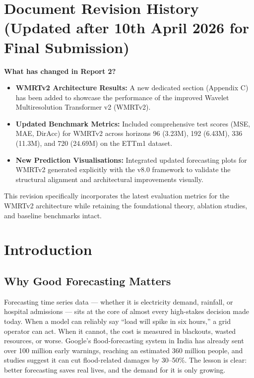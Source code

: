 \documentclass[11pt, letterpaper]{article}
\begin{document}
\section*{Document Revision History (Updated after 10th April 2026 for Final Submission)}
\textbf{What has changed in Report 2?}
\begin{itemize}
    \item \textbf{WMRTv2 Architecture Results:} A new dedicated section (Appendix C) has been added to showcase the performance of the improved Wavelet Multiresolution Transformer v2 (WMRTv2).
    \item \textbf{Updated Benchmark Metrics:} Included comprehensive test scores (MSE, MAE, DirAcc) for WMRTv2 across horizons 96 (3.23M), 192 (6.43M), 336 (11.3M), and 720 (24.69M) on the ETTm1 dataset.
    \item \textbf{New Prediction Visualisations:} Integrated updated forecasting plots for WMRTv2 generated explicitly with the v8.0 framework to validate the structural alignment and architectural improvements visually.
\end{itemize}

\vspace{1cm}
This revision specifically incorporates the latest evaluation metrics for the WMRTv2 architecture while retaining the foundational theory, ablation studies, and baseline benchmarks intact.

\clearpage
\tableofcontents
\clearpage

\section{Introduction}

\subsection{Why Good Forecasting Matters}

Forecasting time series data — whether it is electricity demand, rainfall, or hospital admissions —
sits at the core of almost every high-stakes decision made today. When a model can reliably say
``load will spike in six hours,'' a grid operator can act. When it cannot, the cost is measured
in blackouts, wasted resources, or worse. Google's flood-forecasting system in India has already
sent over 100 million early warnings, reaching an estimated 360 million people, and studies
suggest it can cut flood-related damages by 30--50\%. The lesson is clear: better forecasting
saves real lives, and the demand for it is only growing.
\end{document}
